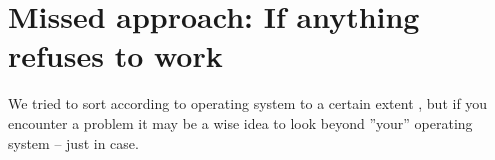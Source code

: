 
\chapter{Missed approach: If anything refuses to work\label{missed}}

We tried to sort  according to operating system to
a certain extent , but if you encounter a problem it may be a wise
idea to look beyond ''your'' operating system -- just in case.

